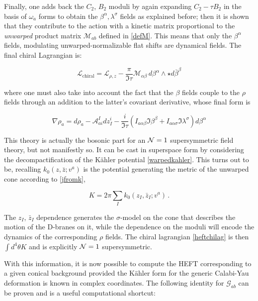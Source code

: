 Finally, one adds back the $C_2$, $B_2$ moduli by again expanding $C_2 - \tau B_2$ in the basis of $\omega_a$ forms to obtain the $\beta^\alpha, \lambda^\sigma$ fields as explained before; then it is shown that they contribute to the action with a kinetic matrix proportional to the \emph{unwarped} product matrix $\mathcal{M}_{ab}$ defined in \eqref{defM}. This means that only the $\beta^\alpha$ fields, modulating unwarped-normalizable flat shifts are dynamical fields. The final chiral Lagrangian is:

\begin{equation}
	\mathcal{L}_\text{chiral} = \mathcal{L}_{\rho,z} - \frac{\pi}{\Im\tau} \mathcal{M}_{\alpha\beta} \,d\beta^\alpha \wedge \star d\bar \beta^\beta
	\label{heftchilag}
\end{equation}

where one must also take into account the fact that the $\beta$ fields couple to the $\rho$ fields through an addition to the latter's covariant derivative, whose final form is

\begin{equation}
	\nabla \rho_a = d\rho_a - \mathcal{A}_{ai}^I dz^i_I - \frac{i}{\Im \tau}\left( I_{a\alpha\beta} \Im \beta^\beta + I_{a\alpha\sigma} \Im \lambda^\sigma \right) d\beta^\alpha
	\label{}
\end{equation}

This theory is actually the bosonic part for an $\mathcal{N} = 1$ supersymmetric field theory, but not manifestly so. It can be cast in superspace form by considering the decompactification of the K\"ahler potential \eqref{warpedkahler}. This turns out to be, recalling $k_0(z,\bar z; v^a)$ is the potential generating the metric of the unwarped cone according to \eqref{jfromk},

\begin{equation}
	K = 2\pi \sum_I k_0(z_I, \bar z_I; v^a)\,.
	\label{heftkahler}
\end{equation}

The $z_I$, $\bar z_I$ dependence generates the $\sigma$-model on the cone that describes the motion of the D-branes on it, while the dependence on the moduli will encode the dynamics of the corresponding $\rho$ fields. The chiral lagrangian \eqref{heftchilag} is then $\int d^4 \theta K$ and is explicitly $\mathcal{N} = 1$ supersymmetric.

With this information, it is now possible to compute the HEFT corresponding to a given conical background provided the K\"ahler form for the generic Calabi-Yau deformation is known in complex coordinates. The following identity for $\mathcal{G}_{ab}$ can be proven \cite{MZ} and is a useful computational shortcut:

